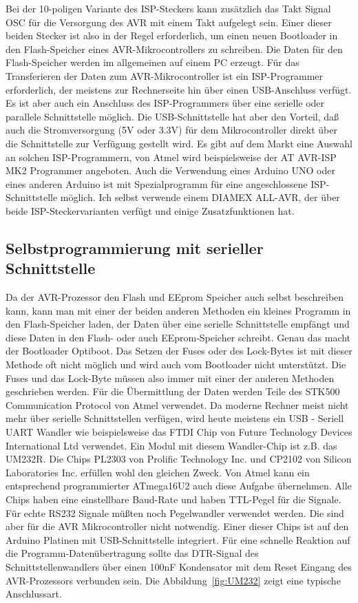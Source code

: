 Bei der 10-poligen Variante des ISP-Steckers kann zusätzlich das Takt Signal OSC für die Versorgung
des AVR mit einem Takt aufgelegt sein.
Einer dieser beiden Stecker ist also in der Regel erforderlich, um einen neuen Bootloader in den
Flash-Speicher eines AVR-Mikrocontrollers zu schreiben. Die Daten für den Flash-Speicher werden
im allgemeinen auf einem PC erzeugt.
Für das Transferieren der Daten zum AVR-Mikrocontroller ist ein ISP-Programmer
erforderlich, der meistens zur Rechnerseite hin über einen USB-Anschluss verfügt. Es ist aber auch
ein Anschluss des ISP-Programmers über eine serielle oder parallele Schnittstelle möglich.
Die USB-Schnittstelle hat aber den Vorteil, daß auch die Stromversorgung (5V oder 3.3V) für
dem Mikrocontroller direkt über die Schnittstelle zur Verfügung gestellt wird.
Es gibt auf dem Markt eine Auswahl an solchen ISP-Programmern, von Atmel wird beispielsweise der 
AT AVR-ISP MK2 Programmer angeboten.
Auch die Verwendung eines Arduino UNO oder eines anderen Arduino ist mit
Spezialprogramm für eine angeschlossene ISP-Schnittstelle  möglich.
Ich selbst verwende einem DIAMEX ALL-AVR, der über beide 
ISP-Steckervarianten verfügt und einige Zusatzfunktionen hat.

\subsection{Selbstprogrammierung mit serieller Schnittstelle}

Da der AVR-Prozessor den Flash und EEprom Speicher auch selbst beschreiben kann, kann man
mit einer der beiden anderen Methoden ein kleines Programm in den Flash-Speicher laden,
der Daten über eine serielle Schnittstelle empfängt und diese Daten in den Flash- oder
auch EEprom-Speicher schreibt. Genau das macht der Bootloader Optiboot.
Das Setzen der Fuses oder des Lock-Bytes ist mit dieser Methode oft nicht möglich und
wird auch vom Bootloader nicht unterstützt. Die Fuses und das Lock-Byte müssen also
immer mit einer der anderen Methoden geschrieben werden.
Für die Übermittlung der Daten werden Teile des STK500 Communication Protocol von Atmel verwendet.
Da moderne Rechner meist nicht mehr über serielle Schnittstellen verfügen, wird heute 
meistens ein USB - Seriell UART Wandler wie beispielsweise das FTDI Chip von Future Technology Devices
International Ltd verwendet. Ein Modul mit diesem Wandler-Chip ist z.B. das UM232R.
Die Chips PL2303 von Prolific Technology Inc. und CP2102 von Silicon Laboratories Inc. 
erfüllen wohl den gleichen Zweck.
Von Atmel kann ein entsprechend programmierter ATmega16U2 auch
diese Aufgabe übernehmen. 
Alle Chips haben eine einstellbare Baud-Rate und haben TTL-Pegel für die Signale.
Für echte RS232 Signale müßten noch Pegelwandler verwendet werden.
Die sind aber für die AVR Mikrocontroller nicht notwendig.
Einer dieser Chips ist auf den Arduino Platinen mit USB-Schnittstelle integriert.
Für eine schnelle Reaktion auf die Programm-Datenübertragung sollte das DTR-Signal des
Schnittstellenwandlers über einen 100nF Kondensator mit dem Reset Eingang des AVR-Prozessors
verbunden sein. Die Abbildung~\ref{fig:UM232} zeigt eine typische Anschlussart.

